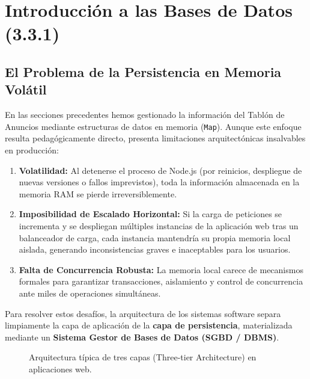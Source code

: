\section{Introducción a las Bases de Datos (3.3.1)}

\subsection{El Problema de la Persistencia en Memoria Volátil}

En las secciones precedentes hemos gestionado la información del Tablón de Anuncios mediante estructuras de datos en memoria (\texttt{Map}). Aunque este enfoque resulta pedagógicamente directo, presenta limitaciones arquitectónicas insalvables en producción:
\begin{enumerate}
    \item \textbf{Volatilidad:} Al detenerse el proceso de Node.js (por reinicios, despliegue de nuevas versiones o fallos imprevistos), toda la información almacenada en la memoria RAM se pierde irreversiblemente.
    \item \textbf{Imposibilidad de Escalado Horizontal:} Si la carga de peticiones se incrementa y se despliegan múltiples instancias de la aplicación web tras un balanceador de carga, cada instancia mantendría su propia memoria local aislada, generando inconsistencias graves e inaceptables para los usuarios.
    \item \textbf{Falta de Concurrencia Robusta:} La memoria local carece de mecanismos formales para garantizar transacciones, aislamiento y control de concurrencia ante miles de operaciones simultáneas.
\end{enumerate}

Para resolver estos desafíos, la arquitectura de los sistemas software separa limpiamente la capa de aplicación de la \textbf{capa de persistencia}, materializada mediante un \textbf{Sistema Gestor de Bases de Datos (SGBD / DBMS)}.

\begin{figure}[htbp]
\centering
{}
\caption{Arquitectura típica de tres capas (Three-tier Architecture) en aplicaciones web.}
\label{fig:three-tier-arch}
\end{figure}

